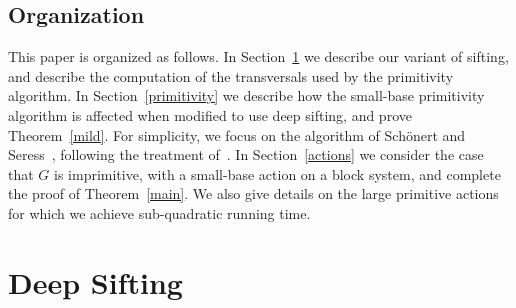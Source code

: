 \documentclass[12pt]{article}
\begin{document}
\subsection{Organization}
This paper is organized as follows.  In Section~\ref{deep}
we describe our variant of sifting,
and describe the computation
of the transversals used by the primitivity algorithm.
In Section~\ref{primitivity} we describe how the small-base
primitivity algorithm is affected when modified to use deep sifting, and prove
Theorem~\ref{mild}. For simplicity, we focus on the
algorithm of Sch\"onert and Seress~\cite{SchonertSeress1994},
following the treatment of~\cite{seress-book}. In Section~\ref{actions}
we consider the case that $G$ is imprimitive, with a small-base
action on a block system, and complete the proof of Theorem~\ref{main}.
We also give details on the large primitive actions
for which we achieve sub-quadratic running time.




\section{Deep Sifting}\label{deep}
\end{document}
